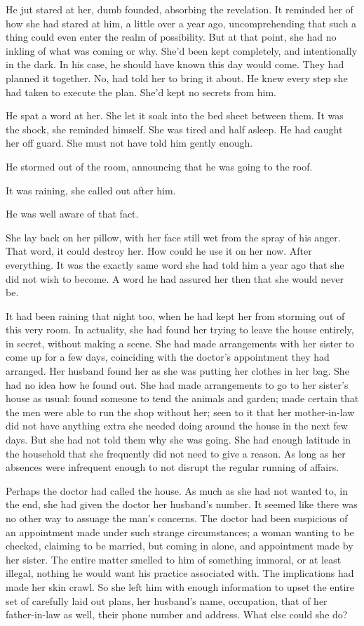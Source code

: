 \documentclass{article}
\newcommand{\egnote}{\todo[color=violet!30]}
\begin{document}
He jut stared at her, dumb founded, absorbing the revelation. It reminded her of how she had stared at him, a little over a year ago, uncomprehending that such a thing could even enter the realm of possibility. But at that point, she had no inkling of what was coming or why. She'd been kept completely, and intentionally in the dark. In his case, he should have known this day would come. They had planned it together. No, had told her to bring it about. He knew every step she had taken to execute the plan. She'd kept no secrets from him.  

He spat a word at her. She let it soak into the bed sheet between them. It was the shock, she reminded himself. She was tired and half asleep. He had caught her off guard. She must not have told him gently enough. 

He stormed out of the room, announcing that he was going to the roof. 

It was raining, she called out after him.

He was well aware of that fact.

She lay back on her pillow, with her face still wet from the spray of his anger. That word, it could destroy her. How could he use it on her now. After everything. It was the exactly same word she had told him a year ago that she did not wish to become. A word he had assured her then that she would never be.

\egnote{timeline: flashback to a year ago, broaching the plan}
It had been raining that night too, when he had kept her from storming out of this very room. In actuality, she\egnote{he?} had found her trying to leave the house entirely, in secret, without making a scene. She had made arrangements with her sister to come up for a few days, coinciding with the doctor's appointment they had arranged. Her husband found her as she was putting her clothes in her bag. She had no idea how he found out. She had made arrangements to go to her sister's house as usual: found someone to tend the animals and garden; made certain that the men were able to run the shop without her; seen to it that her mother-in-law did not have anything extra she needed doing around the house in the next few days. But she had not told them why she was going. She had enough latitude in the household that she frequently did not need to give a reason. As long as her absences were infrequent enough to not disrupt the regular running of affairs.

Perhaps the doctor had called the house. As much as she had not wanted to, in the end, she had given the doctor her husband's number. It seemed like there was no other way to assuage the man's concerns. The doctor had been suspicious of an appointment made under such strange circumstances; a woman wanting to be checked, claiming to be married, but coming in alone, and appointment made by her sister. The entire matter smelled to him of something immoral, or at least illegal, nothing he would want his practice associated with. The implications had made her skin crawl. So she left him with enough information to upset the entire set of carefully laid out plans, her husband's name, occupation, that of her father-in-law as well, their phone number and address. What else could she do?
\end{document}
